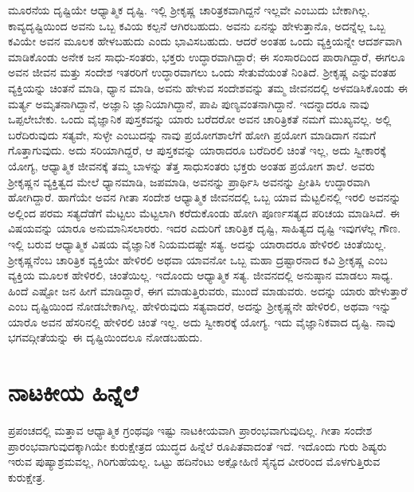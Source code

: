 ಮೂರನೆಯ ದೃಷ್ಟಿಯೇ ಆಧ್ಯಾತ್ಮಿಕ ದೃಷ್ಟಿ. ಇಲ್ಲಿ ಶ‍್ರೀಕೃಷ್ಣ ಚಾರಿತ್ರಕವಾಗಿದ್ದನೆ ಇಲ್ಲವೇ ಎಂಬುದು ಬೇಕಾಗಿಲ್ಲ. ಕಾವ್ಯದೃಷ್ಟಿಯಿಂದ ಅವನು ಒಬ್ಬ ಕವಿಯ ಕಲ್ಪನೆ ಆಗಿರಬಹುದು. ಅವನು ಏನನ್ನು ಹೇಳುತ್ತಾನೊ, ಅದನ್ನೆಲ್ಲ ಒಬ್ಬ ಕವಿಯೇ ಅವನ ಮೂಲಕ ಹೇಳಬಹುದು ಎಂದು ಭಾವಿಸಬಹುದು. ಆದರೆ ಅಂತಹ ಒಂದು ವ್ಯಕ್ತಿಯನ್ನೇ ಆದರ್ಶವಾಗಿ ಮಾಡಿಕೊಂಡು ಅನೇಕ ಜನ ಸಾಧು-ಸಂತರು, ಭಕ್ತರು ಉದ್ಧಾರವಾಗಿದ್ದಾರೆ; ಈ ಸಂಸಾರದಿಂದ ಪಾರಾಗಿದ್ದಾರೆ, ಈಗಲೂ ಅವನ ಜೀವನ ಮತ್ತು ಸಂದೇಶ ಇತರರಿಗೆ ಉದ್ಧಾರವಾಗಲು ಒಂದು ಸೇತುವೆಯಂತೆ ನಿಂತಿದೆ. ಶ‍್ರೀಕೃಷ್ಣ ಎನ್ನುವಂತಹ ವ್ಯಕ್ತಿಯನ್ನು ಚಿಂತನೆ ಮಾಡಿ, ಧ್ಯಾನ ಮಾಡಿ, ಅವನು ಹೇಳುವ ಸಂದೇಶವನ್ನು ತಮ್ಮ ಜೀವನದಲ್ಲಿ ಅಳವಡಿಸಿಕೊಂಡು ಈ ಮರ್ತ್ಯ ಅಮೃತನಾಗಿದ್ದಾನೆ, ಅಜ್ಞಾನಿ ಜ್ಞಾನಿಯಾಗಿದ್ದಾನೆ, ಪಾಪಿ ಪುಣ್ಯವಂತನಾಗಿದ್ದಾನೆ. ಇದನ್ನಾದರೂ ನಾವು ಒಪ್ಪಲೇಬೇಕು. ಒಂದು ವೈಜ್ಞಾನಿಕ ಪುಸ್ತಕವನ್ನು ಯಾರು ಬರೆದರೋ ಅವನ ಚಾರಿತ್ರಿಕತೆ ನಮಗೆ ಮುಖ್ಯವಲ್ಲ. ಅಲ್ಲಿ ಬರೆದಿರುವುದು ಸತ್ಯವೇ, ಸುಳ್ಳೇ ಎಂಬುದನ್ನು ನಾವು ಪ್ರಯೋಗಶಾಲೆಗೆ ಹೋಗಿ ಪ್ರಯೋಗ ಮಾಡಿದಾಗ ನಮಗೆ ಗೊತ್ತಾಗುವುದು. ಅದು ಸರಿಯಾಗಿದ್ದರೆ, ಆ ಪುಸ್ತಕವನ್ನು ಯಾರಾದರೂ ಬರೆದಿರಲಿ ಚಿಂತೆ ಇಲ್ಲ, ಅದು ಸ್ವೀಕಾರಕ್ಕೆ ಯೋಗ್ಯ, ಆಧ್ಯಾತ್ಮಿಕ ಜೀವನಕ್ಕೆ ತಮ್ಮ ಬಾಳನ್ನು ತೆತ್ತ ಸಾಧುಸಂತರು ಭಕ್ತರು ಅಂತಹ ಪ್ರಯೋಗ ಶಾಲೆ. ಅವರು ಶ‍್ರೀಕೃಷ್ಣನ ವ್ಯಕ್ತಿತ್ವದ ಮೇಲೆ ಧ್ಯಾನಮಾಡಿ, ಜಪಮಾಡಿ, ಅವನನ್ನು ಪ್ರಾರ್ಥಿಸಿ ಅವನನ್ನು ಪ್ರೀತಿಸಿ ಉದ್ಧಾರವಾಗಿ ಹೋಗಿದ್ದಾರೆ. ಹಾಗೆಯೇ ಅವನ ಗೀತಾ ಸಂದೇಶ ಆಧ್ಯಾತ್ಮಿಕ ಜೀವನದಲ್ಲಿ ಒಬ್ಬ ಯಾವ ಮೆಟ್ಟಲಿನಲ್ಲಿ ಇರಲಿ ಅವನನ್ನು ಅಲ್ಲಿಂದ ಪರಮ ಸತ್ಯದೆಡೆಗೆ ಮೆಟ್ಟಲು ಮೆಟ್ಟಲಾಗಿ ಕರೆದುಕೊಂಡು ಹೋಗಿ ಪೂರ್ಣಸತ್ಯದ ಪರಿಚಯ ಮಾಡಿಸಿದೆ. ಈ ವಿಷಯವನ್ನು ಯಾರೂ ಅನುಮಾನಿಸಲಾರರು. ಇದರ ಎದುರಿಗೆ ಚಾರಿತ್ರಿಕ ದೃಷ್ಟಿ, ಸಾಹಿತ್ಯದ ದೃಷ್ಟಿ ಇವುಗಳೆಲ್ಲ ಗೌಣ. ಇಲ್ಲಿ ಬರುವ ಆಧ್ಯಾತ್ಮಿಕ ವಿಷಯ ವೈಜ್ಞಾನಿಕ ನಿಯಮದಷ್ಟೇ ಸತ್ಯ. ಅದನ್ನು ಯಾರಾದರೂ ಹೇಳಿರಲಿ ಚಿಂತೆಯಿಲ್ಲ. ಶ‍್ರೀಕೃಷ್ಣನೆಂಬ ಚಾರಿತ್ರಿಕ ವ್ಯಕ್ತಿಯೇ ಹೇಳಿರಲಿ ಅಥವಾ ಯಾವನೋ ಒಬ್ಬ ಮಹಾ ದ್ರಷ್ಟಾರನಾದ ಕವಿ ಶ‍್ರೀಕೃಷ್ಣ ಎಂಬ ವ್ಯಕ್ತಿಯ ಮೂಲಕ ಹೇಳಿರಲಿ, ಚಿಂತೆಯಿಲ್ಲ. ಇದೊಂದು ಆಧ್ಯಾತ್ಮಿಕ ಸತ್ಯ. ಜೀವನದಲ್ಲಿ ಅನುಷ್ಠಾನ ಮಾಡಲು ಸಾಧ್ಯ. ಹಿಂದೆ ಎಷ್ಟೋ ಜನ ಹೀಗೆ ಮಾಡಿದ್ದಾರೆ, ಈಗ ಮಾಡುತ್ತಿರುವರು, ಮುಂದೆ ಮಾಡುವರು. ಅದನ್ನು ಯಾರು ಹೇಳುತ್ತಾರೆ ಎಂಬ ದೃಷ್ಟಿಯಿಂದ ನೋಡಬೇಕಾಗಿಲ್ಲ. ಹೇಳಿರುವುದು ಸತ್ಯವಾದರೆ, ಅದನ್ನು ಶ‍್ರೀಕೃಷ್ಣನೇ ಹೇಳಿರಲಿ, ಅಥವಾ ಇನ್ನು ಯಾರೊ ಅವನ ಹೆಸರಿನಲ್ಲಿ ಹೇಳಿರಲಿ ಚಿಂತೆ ಇಲ್ಲ. ಅದು ಸ್ವೀಕಾರಕ್ಕೆ ಯೋಗ್ಯ. ಇದು ವೈಜ್ಞಾನಿಕವಾದ ದೃಷ್ಟಿ. ನಾವು ಭಗವದ್ಗೀತೆಯನ್ನು ಈ ದೃಷ್ಟಿಯಿಂದಲೂ ನೋಡಬಹುದು.


\section*{ನಾಟಕೀಯ ಹಿನ್ನೆಲೆ}

ಪ್ರಪಂಚದಲ್ಲಿ ಮತ್ತಾವ ಆಧ್ಯಾತ್ಮಿಕ ಗ್ರಂಥವೂ ಇಷ್ಟು ನಾಟಕೀಯವಾಗಿ ಪ್ರಾರಂಭವಾಗುವುದಿಲ್ಲ. ಗೀತಾ ಸಂದೇಶ ಪ್ರಾರಂಭವಾಗುವುದಕ್ಕಾಗಿಯೇ ಕುರುಕ್ಷೇತ್ರದ ಯುದ್ಧದ ಹಿನ್ನೆಲೆ ರೂಪಿತವಾದಂತೆ ಇದೆ. ಇದೊಂದು ಗುರು ಶಿಷ್ಯರು ಇರುವ ಪುಷ್ಯಾಶ್ರಮವಲ್ಲ, ಗಿರಿಗುಹೆಯಲ್ಲ. ಒಟ್ಟು ಹದಿನೆಂಟು ಅಕ್ಷೋಹಿಣಿ ಸೈನ್ಯದ ವೀರರಿಂದ ಮೊಳಗುತ್ತಿರುವ ಕುರುಕ್ಷೇತ್ರ.

